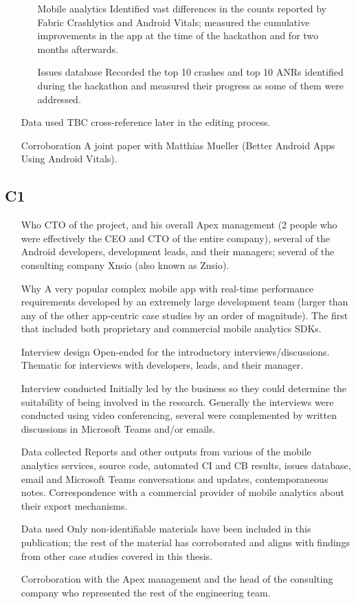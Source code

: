 \begin{itemize}
\begin{itemize}
        \item[Mobile analytics] Identified vast differences in the counts reported by Fabric Crashlytics and Android Vitals; measured the cumulative improvements in the app at the time of the hackathon and for two months afterwards.
        \item[Issues database] Recorded the top 10 crashes and top 10 ANRs identified during the hackathon and measured their progress as some of them were addressed. 
    \end{itemize}
    \item[Data used] TBC cross-reference later in the editing process.
    \item[Corroboration] A joint paper with Matthias Mueller (Better Android Apps Using Android Vitals).
\end{itemize}

\subsection{C1}

\begin{itemize}
    \item[Who] CTO of the project, and his overall Apex management (2 people who were effectively the CEO and CTO of the entire company), several of the Android developers, development leads, and their managers; several of the consulting company Xnsio (also known as Znsio). 
    \item[Why] A very popular complex mobile app with real-time performance requirements developed by an extremely large development team (larger than any of the other app-centric case studies by an order of magnitude). The first that included both proprietary and commercial mobile analytics SDKs.
    \item[Interview design] Open-ended for the introductory interviews/discussions. Thematic for interviews with developers, leads, and their manager.
    \item[Interview conducted] Initially led by the business so they could determine the suitability of being involved in the research. Generally the interviews were conducted using video conferencing, several were complemented by written discussions in Microsoft Teams and/or emails.
    \item[Data collected] Reports and other outputs from various of the mobile analytics services, source code, automated CI and CB results, issues database, email and Microsoft Teams conversations and updates, contemporaneous notes. Correspondence with a commercial provider of mobile analytics about their export mechanisms. 
    \item[Data used] Only non-identifiable materials have been included in this publication; the rest of the material has corroborated and aligns with findings from other case studies covered in this thesis.
    \item[Corroboration] with the Apex management and the head of the consulting company who represented the rest of the engineering team.
\end{itemize}



